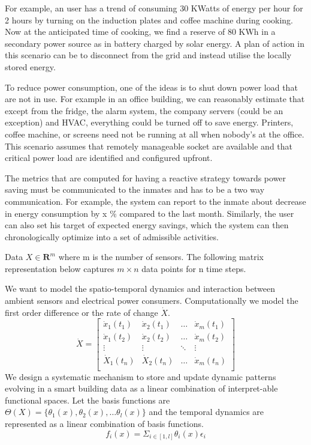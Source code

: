 For example, an user has a trend of consuming 30 KWatts of energy per hour for 2 hours by turning on the induction plates and coffee machine during cooking. Now at the anticipated time of cooking, we find a reserve of 80 KWh in a secondary power source as in battery charged by solar energy. A plan of action in this scenario can be to disconnect from the grid and instead utilise the locally stored energy. 

To reduce power consumption, one of the ideas is to shut down power load that are not in use. For example in an office building, we can reasonably estimate that except from the fridge, the alarm system, the company servers (could be an exception) and HVAC, everything could be turned off to save energy. Printers, coffee machine, or screens need not be running at all when nobody’s at the office. This scenario assumes that remotely manageable socket are available and that critical power load are identified and configured upfront. 

The metrics that are computed for having a reactive strategy towards power saving must be communicated to the inmates and has to be a two way communication. For example, the system can report to the inmate about decrease in energy consumption by x $\%$ compared to the last month. Similarly, the user can also set his target of expected energy savings, which the system can then chronologically optimize into a set of admissible activities.


Data  $X \in \mathbf{R}^m$ where m is the number of sensors. The following matrix representation below captures $m \times n$ data points for n time steps.


 We want to model the spatio-temporal dynamics and interaction between ambient sensors and electrical power consumers. Computationally we model the first order difference or the rate of change $\dot{X}$. 
\begin{equation}
\dot{X} =  \begin{bmatrix}
\dot{x}_1(t_1) & \dot{x}_2(t_1)&\hdots &  \dot{x}_m(t_1)\\
\dot{x}_1(t_2) & \dot{x}_2(t_2)&\hdots &  \dot{x}_m(t_2)\\
\vdots & \vdots & \ddots &  \vdots \\
\dot{X}_1(t_n) & \dot{X}_2(t_n)&\hdots &  \dot{x}_m(t_n)\\
\end{bmatrix} 
\end{equation}
We design a systematic mechanism to store and update dynamic patterns evolving in a smart building data as a linear combination of interpret-able functional spaces.
Let the basis functions are $ \Theta(X) = \{ \theta_1(x), \theta_2(x) , \dots \theta_l(x) \}$ and the temporal dynamics are represented as a linear combination of basis functions. 
\begin{equation}
    f_i(x) = \Sigma_{i \in [1, l]} \theta_i(x) \epsilon_i 
\end{equation}

